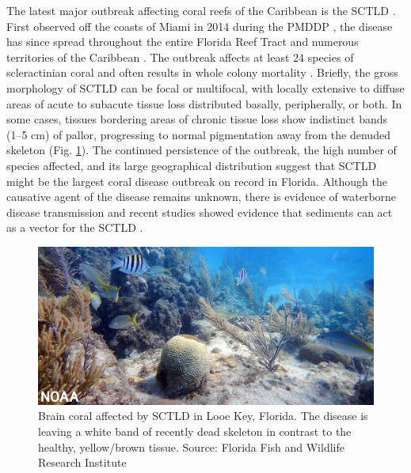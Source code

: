 The latest major outbreak affecting coral reefs of the Caribbean is the SCTLD \citep{noaa2018}. First observed off the coasts of Miami in 2014 during the PMDDP \citep{precht2016unprecedented}, the disease has since spread throughout the entire Florida Reef Tract and numerous territories of the Caribbean \citep{alvarez2019rapid, kramer2019map, estrada2021effects}. The outbreak affects at least 24 species of scleractinian coral and often results in whole colony mortality \citep{precht2016unprecedented, walton2018impacts}. Briefly, the gross morphology of SCTLD can be focal or multifocal, with locally extensive to diffuse areas of acute to subacute tissue loss distributed basally, peripherally, or both. In some cases, tissues bordering areas of chronic tissue loss show indistinct bands (1–5 cm) of pallor, progressing to normal pigmentation away from the denuded skeleton (Fig. \ref{intro:sctld}). The continued persistence of the outbreak, the high number of species affected, and its large geographical distribution suggest that SCTLD might be the largest coral disease outbreak on record in Florida. Although the causative agent of the disease remains unknown, there is evidence of waterborne disease transmission \citep{aeby2019pathogenesis,eaton2021measuring,meiling2021variable} and recent studies showed evidence that sediments can act as a vector for the SCTLD \citep{rosales2020rhodobacterales, studivan2022reef}. 

\begin{figure}
    \centering
    \includegraphics[width=\textwidth]{chapters/intro/figures/sctld.jpg}
    \caption{Brain coral affected by SCTLD in Looe Key, Florida. The disease is leaving a white band of recently dead skeleton in contrast to the healthy, yellow/brown tissue. Source: Florida Fish and Wildlife Research Institute}
    \label{intro:sctld}
\end{figure}

